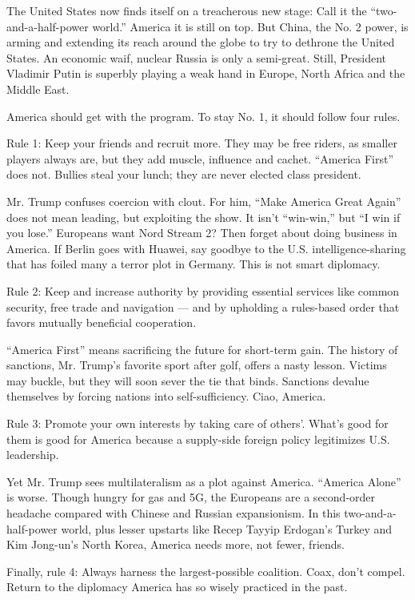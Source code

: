 The United States now finds itself on a treacherous new stage: Call it
the ``two-and-a-half-power world.'' America it is still on top. But
China, the No. 2 power, is arming and extending its reach around the
globe to try to dethrone the United States. An economic waif, nuclear
Russia is only a semi-great. Still, President Vladimir Putin is superbly
playing a weak hand in Europe, North Africa and the Middle East.

America should get with the program. To stay No. 1, it should follow
four rules.

Rule 1: Keep your friends and recruit more. They may be free riders, as
smaller players always are, but they add muscle, influence and cachet.
``America First'' does not. Bullies steal your lunch; they are never
elected class president.

Mr. Trump confuses coercion with clout. For him, ``Make America Great
Again'' does not mean leading, but exploiting the show. It isn't
``win-win,'' but ``I win if you lose.'' Europeans want Nord Stream 2?
Then forget about doing business in America. If Berlin goes with Huawei,
say goodbye to the U.S. intelligence-sharing that has foiled many a
terror plot in Germany. This is not smart diplomacy.

Rule 2: Keep and increase authority by providing essential services like
common security, free trade and navigation --- and by upholding a
rules-based order that favors mutually beneficial cooperation.

``America First'' means sacrificing the future for short-term gain. The
history of sanctions, Mr. Trump's favorite sport after golf, offers a
nasty lesson. Victims may buckle, but they will soon sever the tie that
binds. Sanctions devalue themselves by forcing nations into
self-sufficiency. Ciao, America.

Rule 3: Promote your own interests by taking care of others'. What's
good for them is good for America because a supply-side foreign policy
legitimizes U.S. leadership.

Yet Mr. Trump sees multilateralism as a plot against America. ``America
Alone'' is worse. Though hungry for gas and 5G, the Europeans are a
second-order headache compared with Chinese and Russian expansionism. In
this two-and-a-half-power world, plus lesser upstarts like Recep Tayyip
Erdogan's Turkey and Kim Jong-un's North Korea, America needs more, not
fewer, friends.

Finally, rule 4: Always harness the largest-possible coalition. Coax,
don't compel. Return to the diplomacy America has so wisely practiced in
the past.

